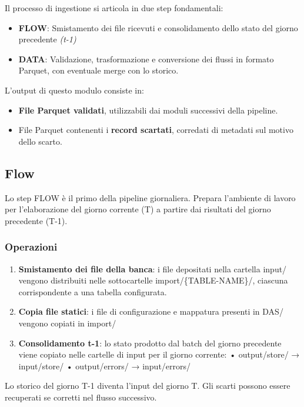 \documentclass[12pt,a4paper,openright,twoside]{book}
\begin{document}
Il processo di ingestione si articola in due step fondamentali:
\begin{itemize}
    \item \textbf{FLOW}: Smistamento dei file ricevuti e consolidamento dello stato del giorno precedente \textit{(t-1)}
    \item \textbf{DATA}: Validazione, trasformazione e conversione dei flussi in formato Parquet, con eventuale merge con lo storico.
\end{itemize}

L'output di questo modulo consiste in:
\begin{itemize}
    \item \textbf{File Parquet validati}, utilizzabili dai moduli successivi della pipeline.
    \item File Parquet contenenti i \textbf{record scartati}, corredati di metadati sul motivo dello scarto.
\end{itemize}

\subsection{Flow}
Lo step FLOW è il primo della pipeline giornaliera. Prepara l’ambiente di lavoro per l’elaborazione del giorno corrente (T) a partire dai risultati del giorno precedente (T-1).

\subsubsection{Operazioni}
\begin{enumerate}
    \item \textbf{Smistamento dei file della banca}: i file depositati nella cartella input/ vengono distribuiti nelle sottocartelle import/\{TABLE-NAME\}/, ciascuna corrispondente a una tabella configurata.
    \item \textbf{Copia file statici}: i file di configurazione e mappatura presenti in DAS/ vengono copiati in import/
    \newpage
    \item \textbf{Consolidamento t-1}: lo stato prodotto dal batch del giorno precedente viene copiato nelle cartelle di input per il giorno corrente:
        \newline • output/store/ → input/store/
        \newline • output/errors/ → input/errors/
\end{enumerate}

Lo storico del giorno T-1 diventa l'input del giorno T. Gli scarti possono essere recuperati se corretti nel flusso successivo.
\end{document}

